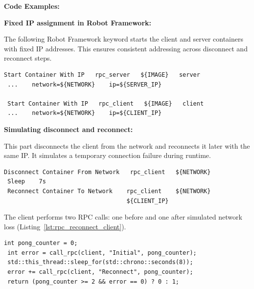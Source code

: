 \vspace{0.5em}
\textbf{Code Examples:}

\vspace{0.4em}
\textbf{Fixed IP assignment in Robot Framework:}

\vspace{0.4em}
The following Robot Framework keyword starts the client and server containers with fixed IP addresses. This ensures consistent addressing across disconnect and reconnect steps.

\vspace{0.4em}
\begin{lstlisting}[style=cppstyle, caption={Starting containers with fixed IPs}, label={lst:rf_start_with_ip}, captionpos=b]
 Start Container With IP   rpc_server   ${IMAGE}   server
 ...    network=${NETWORK}    ip=${SERVER_IP}
 
 Start Container With IP   rpc_client   ${IMAGE}   client
 ...    network=${NETWORK}    ip=${CLIENT_IP}
\end{lstlisting}

\newpage
\vspace{0.4em}
\textbf{Simulating disconnect and reconnect:}

\vspace{0.4em}
This part disconnects the client from the network and reconnects it later with the same IP. It simulates a temporary connection failure during runtime.

\vspace{0.4em}
\begin{lstlisting}[style=cppstyle, caption={Simulating network disconnect and reconnect}, label={lst:rf_disconnect_reconnect}, captionpos=b]
 Disconnect Container From Network   rpc_client   ${NETWORK}
 Sleep    7s
 Reconnect Container To Network    rpc_client    ${NETWORK}
                                   ${CLIENT_IP}
\end{lstlisting}


\vspace{0.3em}
The client performs two RPC calls: one before and one after simulated network loss (Listing~\ref{lst:rpc_reconnect_client}).

\begin{lstlisting}[style=cppstyle, caption={Client performs reconnect and second RPC call}, label={lst:rpc_reconnect_client}, captionpos=b]
 int pong_counter = 0;
 int error = call_rpc(client, "Initial", pong_counter);
 std::this_thread::sleep_for(std::chrono::seconds(8));
 error += call_rpc(client, "Reconnect", pong_counter);
 return (pong_counter >= 2 && error == 0) ? 0 : 1;
\end{lstlisting}

